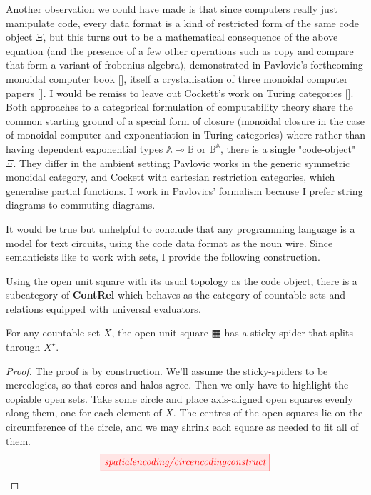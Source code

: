 \begin{scholium}
Another observation we could have made is that since computers really just manipulate code, every data format is a kind of restricted form of the same code object $\Xi$, but this turns out to be a mathematical consequence of the above equation (and the presence of a few other operations such as copy and compare that form a variant of frobenius algebra), demonstrated in Pavlovic's forthcoming monoidal computer book [], itself a crystallisation of three monoidal computer papers []. I would be remiss to leave out Cockett's work on Turing categories []. Both approaches to a categorical formulation of computability theory share the common starting ground of a special form of closure (monoidal closure in the case of monoidal computer and exponentiation in Turing categories) where rather than having dependent exponential types $\mathbb{A} \multimap \mathbb{B}$ or $\mathbb{B}^\mathbb{A}$, there is a single "code-object" $\Xi$. They differ in the ambient setting; Pavlovic works in the generic symmetric monoidal category, and Cockett with cartesian restriction categories, which generalise partial functions. I work in Pavlovics' formalism because I prefer string diagrams to commuting diagrams.
\end{scholium}

It would be true but unhelpful to conclude that any programming language is a model for text circuits, using the code data format as the noun wire. Since semanticists like to work with sets, I provide the following construction.

\begin{construction}
Using the open unit square with its usual topology as the code object, there is a subcategory of \textbf{ContRel} which behaves as the category of countable sets and relations equipped with universal evaluators.
\end{construction}

\begin{proposition}
For any countable set $X$, the open unit square $\squarehvfill$ has a sticky spider that splits through $X^\star$.
\begin{proof}
The proof is by construction. We'll assume the sticky-spiders to be mereologies, so that cores and halos agree. Then we only have to highlight the copiable open sets. Take some circle and place axis-aligned open squares evenly along them, one for each element of $X$. The centres of the open squares lie on the circumference of the circle, and we may shrink each square as needed to fit all of them.
\[\scalebox{1}{\tikzfig{spatialencoding/circencodingconstruct}}\]
\end{proof}
\end{proposition}

